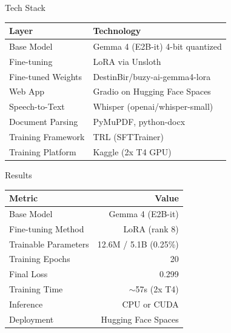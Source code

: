 \documentclass[aspectratio=169]{beamer}
\begin{document}
\begin{frame}{Tech Stack}
  \centering
  \begin{tabular}{ll}
    \toprule
    \textbf{Layer} & \textbf{Technology} \\
    \midrule
    Base Model & Gemma 4 (E2B-it) 4-bit quantized \\
    Fine-tuning & LoRA via Unsloth \\
    Fine-tuned Weights & DestinBir/buzy-ai-gemma4-lora \\
    Web App & Gradio on Hugging Face Spaces \\
    Speech-to-Text & Whisper (openai/whisper-small) \\
    Document Parsing & PyMuPDF, python-docx \\
    Training Framework & TRL (SFTTrainer) \\
    Training Platform & Kaggle (2x T4 GPU) \\
    \bottomrule
  \end{tabular}
\end{frame}

\begin{frame}{Results}
  \centering
  \begin{tabular}{lr}
    \toprule
    \textbf{Metric} & \textbf{Value} \\
    \midrule
    Base Model & Gemma 4 (E2B-it) \\
    Fine-tuning Method & LoRA (rank 8) \\
    Trainable Parameters & 12.6M / 5.1B (0.25\%) \\
    Training Epochs & 20 \\
    Final Loss & 0.299 \\
    Training Time & $\sim$57s (2x T4) \\
    Inference & CPU or CUDA \\
    Deployment & Hugging Face Spaces \\
    \bottomrule
  \end{tabular}
\end{frame}
\end{document}
